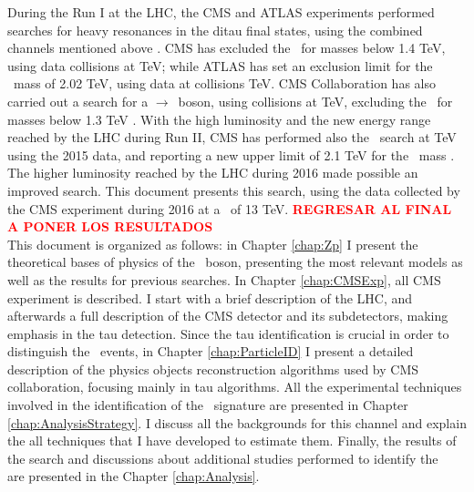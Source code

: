 
During the Run I at the LHC, the CMS and ATLAS experiments performed searches for heavy resonances 
in the ditau final states, using the combined channels mentioned above \cite{CMSZprime2ditaubib,ATLASZprime2ditaubib}.
CMS has excluded the \ZprimeSSM~for masses below 1.4 TeV, using data collisions at  TeV; while ATLAS 
has set an exclusion limit for the \ZprimeSSM~mass of 2.02 TeV, using data at collisions  TeV. 
CMS Collaboration has also carried out a search for a \Zprime$\rightarrow$\taue\taumu~boson, using collisions at  TeV, excluding
the \ZprimeSSM~for masses below 1.3 TeV \cite{CMSZprime2ditauelectronmuonbib}. With the high luminosity and the new energy range 
reached by the LHC during Run II, CMS has performed also the \Zprimetotautau~search at  TeV using the 2015 data, and reporting 
a new upper limit of 2.1 TeV for the \ZprimeSSM~mass \cite{CMSZprime2tausRunII}. The higher luminosity reached 
by the LHC during 2016 made possible an improved search. This document presents this search, using 
the data collected by the CMS experiment during 2016 at a \centermassenergy~of 13 TeV. \textbf{\textcolor{red}{REGRESAR AL FINAL A PONER LOS RESULTADOS}}\\


This document is organized as follows: in Chapter \ref{chap:Zp} I present the theoretical bases of physics of 
the \Zprime~boson, presenting the most relevant models as well as the results for previous searches. In 
Chapter \ref{chap:CMSExp}, all CMS experiment is described. I start with a brief description 
of the LHC, and afterwards a full description of the CMS detector and its subdetectors, making emphasis 
in the tau detection. Since the tau identification is crucial in order to distinguish the \Zprime~events, in Chapter \ref{chap:ParticleID}
I present a detailed description of the physics objects reconstruction algorithms used
by CMS collaboration, focusing mainly in tau algorithms. All the experimental techniques involved in the 
identification of the \Zprimetotauh~signature are presented in Chapter \ref{chap:AnalysisStrategy}. 
I discuss all the backgrounds for this channel and explain the all techniques that I have developed 
to estimate them. Finally, the results of the search and discussions about additional studies performed to identify the \Zprime~ 
are presented in the Chapter \ref{chap:Analysis}.


